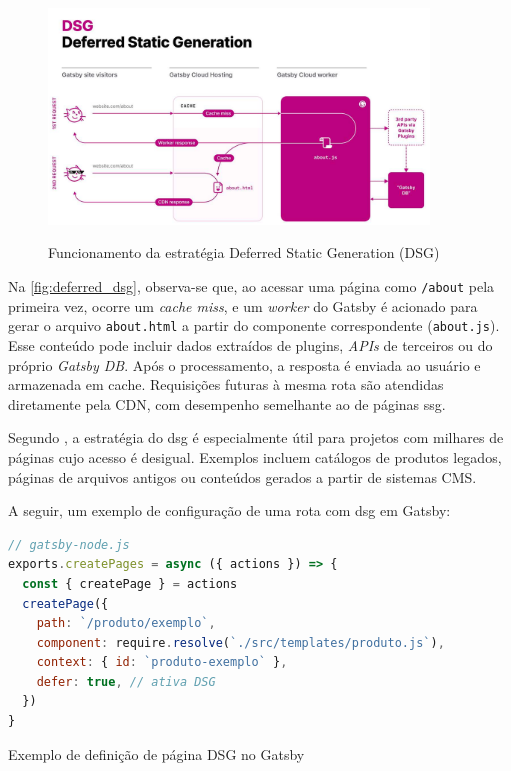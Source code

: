 \begin{figure}[H]
  \centering
  \caption{Funcionamento da estratégia Deferred Static Generation (DSG)}
  \includegraphics[width=0.9\textwidth]{media/deferred_static_generation_dsg.png}
  \label{fig:deferred_dsg}
\end{figure}

Na \autoref{fig:deferred_dsg}, observa-se que, ao acessar uma página como \texttt{/about} pela primeira vez, ocorre um \textit{cache miss}, e um \textit{worker} do Gatsby é acionado para gerar o arquivo \texttt{about.html} a partir do componente correspondente (\texttt{about.js}). Esse conteúdo pode incluir dados extraídos de plugins, \textit{APIs} de terceiros ou do próprio \textit{Gatsby DB}. Após o processamento, a resposta é enviada ao usuário e armazenada em cache. Requisições futuras à mesma rota são atendidas diretamente pela CDN, com desempenho semelhante ao de páginas \acrshort{ssg}.

Segundo , a estratégia do \acrshort{dsg} é especialmente útil para projetos com milhares de páginas cujo acesso é desigual. Exemplos incluem catálogos de produtos legados, páginas de arquivos antigos ou conteúdos gerados a partir de sistemas CMS.

A seguir, um exemplo de configuração de uma rota com \acrshort{dsg} em Gatsby:

\begin{codigo}[H]
  \begin{lstlisting}[language=JavaScript]
// gatsby-node.js
exports.createPages = async ({ actions }) => {
  const { createPage } = actions
  createPage({
    path: `/produto/exemplo`,
    component: require.resolve(`./src/templates/produto.js`),
    context: { id: `produto-exemplo` },
    defer: true, // ativa DSG
  })
}
  \end{lstlisting}
  \caption{Exemplo de definição de página DSG no Gatsby}
  \label{cod:dsg_example}
\end{codigo}

